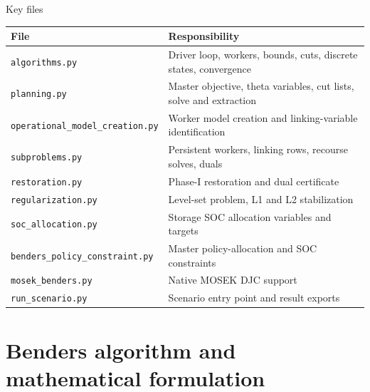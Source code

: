 \documentclass[aspectratio=169,10pt]{beamer}
\begin{document}
\begin{frame}{Key files}
\scriptsize
\begin{tabular}{@{}p{}p{}@{}}
\toprule File & Responsibility\\\midrule
\texttt{algorithms.py} & Driver loop, workers, bounds, cuts, discrete states, convergence\\
\texttt{planning.py} & Master objective, theta variables, cut lists, solve and extraction\\
\texttt{operational\_model\_creation.py} & Worker model creation and linking-variable identification\\
\texttt{subproblems.py} & Persistent workers, linking rows, recourse solves, duals\\
\texttt{restoration.py} & Phase-I restoration and dual certificate\\
\texttt{regularization.py} & Level-set problem, L1 and L2 stabilization\\
\texttt{soc\_allocation.py} & Storage SOC allocation variables and targets\\
\texttt{benders\_policy\_constraint.py} & Master policy-allocation and SOC constraints\\
\texttt{mosek\_benders.py} & Native MOSEK DJC support\\
\texttt{run\_scenario.py} & Scenario entry point and result exports\\
\bottomrule
\end{tabular}
\end{frame}

\section{Benders algorithm and mathematical formulation}
\end{document}
